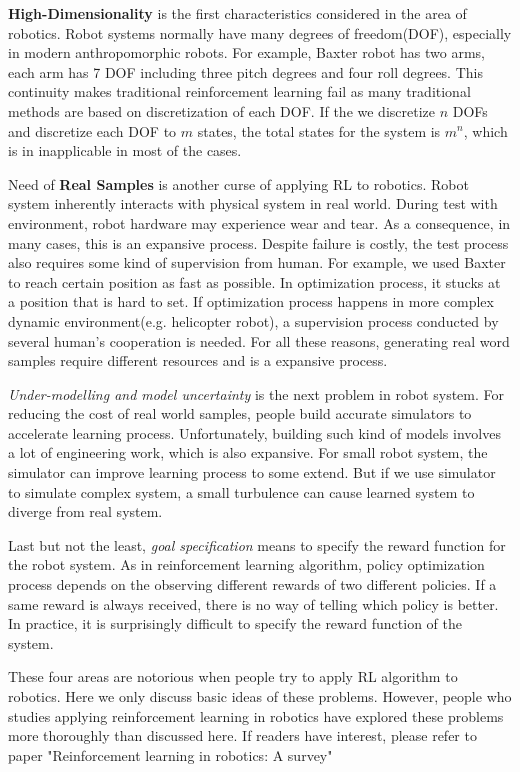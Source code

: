 \documentclass[officiallayout]{tktla}
\begin{document}
\textbf{High-Dimensionality} is the first characteristics considered in the area of robotics. Robot systems normally have many degrees of freedom(DOF), especially in modern anthropomorphic robots. For example, Baxter robot has two arms, each arm has 7 DOF including three pitch degrees and four roll degrees. This continuity makes traditional reinforcement learning fail as many traditional methods are based on discretization of each DOF. If the we discretize $n$ DOFs and discretize each DOF to $m$ states, the total states for the system is $m^n$, which is in inapplicable in most of the cases.

Need of \textbf{Real Samples} is another curse of applying RL to robotics. Robot system inherently interacts with physical system in real world. During test with environment, robot hardware may experience wear and tear. As a consequence, in many cases, this is an expansive process. Despite failure is costly, the test process also requires some kind of supervision from human. For example, we used Baxter to reach certain position as fast as possible. In optimization process, it stucks at a position that is hard to set. If optimization process happens in more complex dynamic environment(e.g. helicopter robot), a supervision process conducted by several human's cooperation is needed. For all these reasons, generating real word samples require different resources and is a expansive process.

\textit{Under-modelling and model uncertainty} is the next problem in robot system. For reducing the cost of real world samples, people build accurate simulators to accelerate learning process. Unfortunately, building such kind of models involves a lot of engineering work, which is also expansive. For small robot system, the simulator can improve learning process to some extend. But if we use simulator to simulate complex system, a small turbulence can cause learned system to diverge from real system.

Last but not the least, \textit{goal specification } means to specify the reward function for the robot system. As in reinforcement learning algorithm, policy optimization process depends on the observing different rewards of two different policies. If a same reward is always received, there is no way of telling which policy is better. In practice, it is surprisingly difficult to specify the reward function of the system. 

These four areas are notorious when people try to apply RL algorithm to robotics. Here we only discuss basic ideas of these problems. However, people who studies applying reinforcement learning in robotics have explored these problems more thoroughly than discussed here. If readers have interest, please refer to paper "Reinforcement learning in robotics: A survey"\cite{Kober2013}
\end{document}
